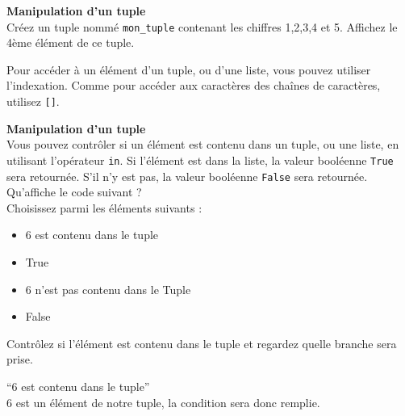     \begin{Exercice}[5 minutes] \textbf{Manipulation d'un tuple}\\
        Créez un tuple nommé \lstinline{mon_tuple} contenant les chiffres 1,2,3,4 et 5. Affichez le 4ème élément de ce tuple.
    
        \begin{conseil}
            Pour accéder à un élément d'un tuple, ou d'une liste, vous pouvez utiliser l'indexation. Comme pour accéder aux caractères des chaînes de caractères, utilisez \lstinline{[]}.
        \end{conseil}
        
        \begin{solution}
             
        \end{solution}
    \end{Exercice}

    
    
    \begin{Exercice}[5 minutes] \textbf{Manipulation d'un tuple}\\
        Vous pouvez contrôler si un élément est contenu dans un tuple, ou une liste, en utilisant l'opérateur \lstinline{in}. Si l'élément est dans la liste, la valeur booléenne \lstinline{True} sera retournée. S'il n'y est pas, la valeur booléenne \lstinline{False} sera retournée. \\
        
        Qu'affiche le code suivant ? \\
        
        
        
        Choisissez parmi les éléments suivants : \\
        
        \begin{itemize}
        \item 6 est contenu dans le tuple
        \item True
        \item 6 n'est pas contenu dans le Tuple
        \item False \\
        \end{itemize}
    
        \begin{conseil}
            Contrôlez si l'élément est contenu dans le tuple et regardez quelle branche sera prise.
        \end{conseil}
        
        \begin{solution}
           ``6 est contenu dans le tuple'' \\
           6 est un élément de notre tuple, la condition sera donc remplie.
        \end{solution}
    \end{Exercice}
    
